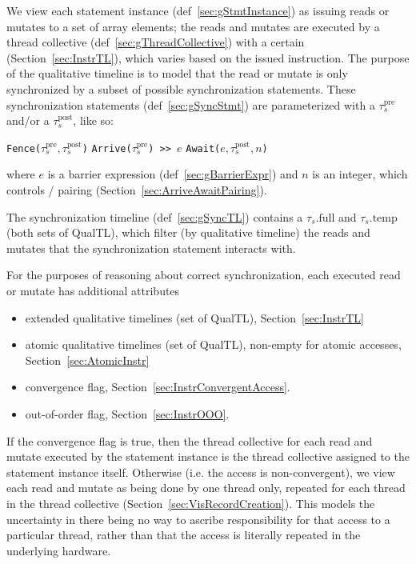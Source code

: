 
We view each statement instance (def~\ref{sec:gStmtInstance}) as issuing reads or mutates to a set of array elements; the reads and mutates are executed by a thread collective (def~\ref{sec:gThreadCollective}) with a certain  (Section~\ref{sec:InstrTL}), which varies based on the issued instruction.
The purpose of the qualitative timeline is to model that the read or mutate is only synchronized by a subset of possible synchronization statements.
These synchronization statements (def~\ref{sec:gSyncStmt}) are parameterized with a  $\tau_s^\mathrm{pre}$ and/or a  $\tau_s^\mathrm{post}$, like so:

\hphantom{spacing}
\texttt{Fence($\tau_s^\mathrm{pre}, \tau_s^\mathrm{post}$)}
\hfill
\texttt{Arrive($\tau_s^\mathrm{pre}$) >}\texttt{> $e$}
\hfill
\texttt{Await($e, \tau_s^\mathrm{post}, n$)}
\hphantom{spacing}

where $e$ is a barrier expression (def~\ref{sec:gBarrierExpr}) and $n$ is an integer, which controls / pairing (Section~\ref{sec:ArriveAwaitPairing}).

The synchronization timeline (def~\ref{sec:gSyncTL}) contains a  $\tau_s.\mathrm{full}$ and  $\tau_s.\mathrm{temp}$ (both sets of \textsf{QualTL}), which filter (by qualitative timeline) the reads and mutates that the synchronization statement interacts with.

For the purposes of reasoning about correct synchronization, each executed read or mutate has additional attributes
\begin{itemize}
  \item extended qualitative timelines (set of \textsf{QualTL}), Section~\ref{sec:InstrTL}
  \item atomic qualitative timelines (set of \textsf{QualTL}), non-empty for atomic accesses, Section~\ref{sec:AtomicInstr}
  \item convergence flag, Section~\ref{sec:InstrConvergentAccess}.
  \item out-of-order flag, Section~\ref{sec:InstrOOO}.
\end{itemize}
If the convergence flag is true, then the thread collective for each read and mutate executed by the statement instance is the thread collective assigned to the statement instance itself.
Otherwise (i.e. the access is non-convergent), we view each read and mutate as being done by one thread only, repeated for each thread in the thread collective (Section~\ref{sec:VisRecordCreation}).
This models the uncertainty in there being no way to ascribe responsibility for that access to a particular thread, rather than that the access is literally repeated in the underlying hardware.

